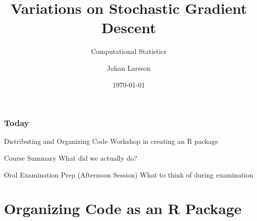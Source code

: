 \documentclass[aspectratio=1610,onlytextwidth]{beamer}
\date{\today}
\title{Variations on Stochastic Gradient Descent}
\subtitle{Computational Statistics}
\author{Johan Larsson}
\institute{Department of Mathematical Sciences, University of Copenhagen}
\begin{document}
\maketitle

%
%

%

\begin{frame}[c]
  \frametitle{Today}

  \begin{block}{Distributing and Organizing Code}
    Workshop in creating an R package
  \end{block}

  \pause

  \begin{block}{Course Summary}
    What did we actually do?
  \end{block}

  \pause

  \begin{block}{Oral Examination Prep (Afternoon Session)}
    What to think of during examination
  \end{block}
\end{frame}

\section{Organizing Code as an R Package}
\end{document}
